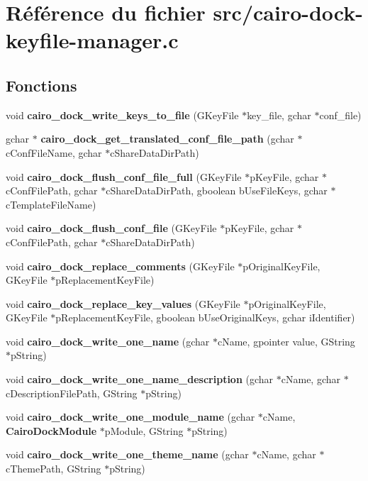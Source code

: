 \section{R\'{e}f\'{e}rence du fichier src/cairo-dock-keyfile-manager.c}
\label{cairo-dock-keyfile-manager_8c}
\subsection*{Fonctions}
\begin{CompactItemize}
\item 
void {\bf cairo\_\-dock\_\-write\_\-keys\_\-to\_\-file} (GKey\-File $\ast$key\_\-file, gchar $\ast$conf\_\-file)
\item 
gchar $\ast$ {\bf cairo\_\-dock\_\-get\_\-translated\_\-conf\_\-file\_\-path} (gchar $\ast$c\-Conf\-File\-Name, gchar $\ast$c\-Share\-Data\-Dir\-Path)
\item 
void {\bf cairo\_\-dock\_\-flush\_\-conf\_\-file\_\-full} (GKey\-File $\ast$p\-Key\-File, gchar $\ast$c\-Conf\-File\-Path, gchar $\ast$c\-Share\-Data\-Dir\-Path, gboolean b\-Use\-File\-Keys, gchar $\ast$c\-Template\-File\-Name)
\item 
void {\bf cairo\_\-dock\_\-flush\_\-conf\_\-file} (GKey\-File $\ast$p\-Key\-File, gchar $\ast$c\-Conf\-File\-Path, gchar $\ast$c\-Share\-Data\-Dir\-Path)
\item 
void {\bf cairo\_\-dock\_\-replace\_\-comments} (GKey\-File $\ast$p\-Original\-Key\-File, GKey\-File $\ast$p\-Replacement\-Key\-File)
\item 
void {\bf cairo\_\-dock\_\-replace\_\-key\_\-values} (GKey\-File $\ast$p\-Original\-Key\-File, GKey\-File $\ast$p\-Replacement\-Key\-File, gboolean b\-Use\-Original\-Keys, gchar i\-Identifier)
\item 
void {\bf cairo\_\-dock\_\-write\_\-one\_\-name} (gchar $\ast$c\-Name, gpointer value, GString $\ast$p\-String)
\item 
void {\bf cairo\_\-dock\_\-write\_\-one\_\-name\_\-description} (gchar $\ast$c\-Name, gchar $\ast$c\-Description\-File\-Path, GString $\ast$p\-String)
\item 
void {\bf cairo\_\-dock\_\-write\_\-one\_\-module\_\-name} (gchar $\ast$c\-Name, {\bf Cairo\-Dock\-Module} $\ast$p\-Module, GString $\ast$p\-String)
\item 
void {\bf cairo\_\-dock\_\-write\_\-one\_\-theme\_\-name} (gchar $\ast$c\-Name, gchar $\ast$c\-Theme\-Path, GString $\ast$p\-String)
\item 

\end{CompactItemize}
